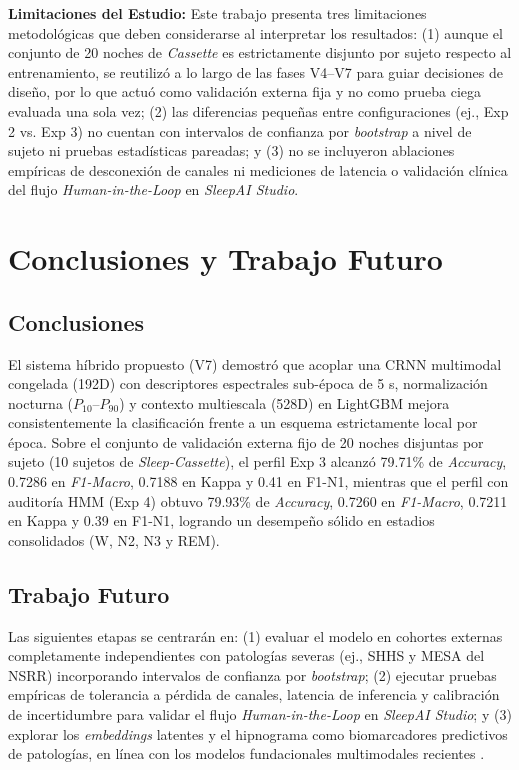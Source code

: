 \documentclass[conference]{IEEEtran}
\begin{document}
\textbf{Limitaciones del Estudio:}
Este trabajo presenta tres limitaciones metodológicas que deben considerarse al interpretar los resultados: (1) aunque el conjunto de 20 noches de \textit{Cassette} es estrictamente disjunto por sujeto respecto al entrenamiento, se reutilizó a lo largo de las fases V4--V7 para guiar decisiones de diseño, por lo que actuó como validación externa fija y no como prueba ciega evaluada una sola vez; (2) las diferencias pequeñas entre configuraciones (ej., Exp 2 vs. Exp 3) no cuentan con intervalos de confianza por \textit{bootstrap} a nivel de sujeto ni pruebas estadísticas pareadas; y (3) no se incluyeron ablaciones empíricas de desconexión de canales ni mediciones de latencia o validación clínica del flujo \textit{Human-in-the-Loop} en \textit{SleepAI Studio}.

\section{Conclusiones y Trabajo Futuro}
\subsection{Conclusiones}
El sistema híbrido propuesto (V7) demostró que acoplar una CRNN multimodal congelada (192D) con descriptores espectrales sub-época de 5 s, normalización nocturna ($P_{10}$--$P_{90}$) y contexto multiescala (528D) en LightGBM mejora consistentemente la clasificación frente a un esquema estrictamente local por época. Sobre el conjunto de validación externa fijo de 20 noches disjuntas por sujeto (10 sujetos de \textit{Sleep-Cassette}), el perfil Exp 3 alcanzó 79.71\% de \textit{Accuracy}, 0.7286 en \textit{F1-Macro}, 0.7188 en Kappa y 0.41 en F1-N1, mientras que el perfil con auditoría HMM (Exp 4) obtuvo 79.93\% de \textit{Accuracy}, 0.7260 en \textit{F1-Macro}, 0.7211 en Kappa y 0.39 en F1-N1, logrando un desempeño sólido en estadios consolidados (W, N2, N3 y REM).

\subsection{Trabajo Futuro}
Las siguientes etapas se centrarán en: (1) evaluar el modelo en cohortes externas completamente independientes con patologías severas (ej., SHHS y MESA del NSRR) incorporando intervalos de confianza por \textit{bootstrap}; (2) ejecutar pruebas empíricas de tolerancia a pérdida de canales, latencia de inferencia y calibración de incertidumbre para validar el flujo \textit{Human-in-the-Loop} en \textit{SleepAI Studio}; y (3) explorar los \textit{embeddings} latentes y el hipnograma como biomarcadores predictivos de patologías, en línea con los modelos fundacionales multimodales recientes \cite{thapa2026nature}.
\end{document}
